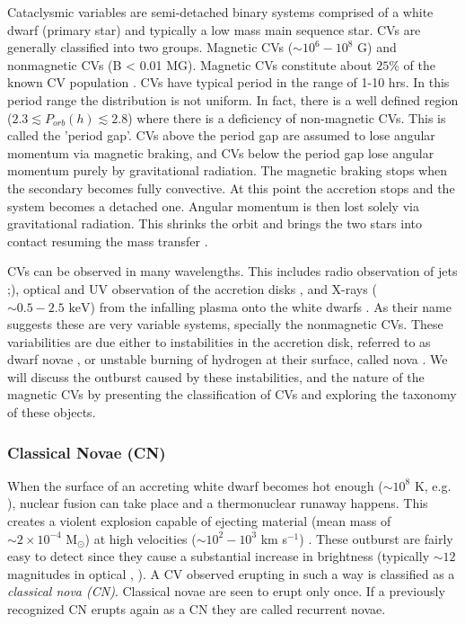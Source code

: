 Cataclysmic variables are semi-detached binary systems comprised of a white dwarf (primary star) and typically a low mass main sequence star. CVs are generally classified into two groups. Magnetic CVs ($\sim 10^6 - 10^8$ G) and nonmagnetic CVs (B < 0.01 MG). Magnetic CVs constitute about $25 \%$ of the known CV population \citep{balman_x-ray_2012}. CVs have typical period in the range of 1-10 hrs. In this period range the distribution is not uniform. In fact, there is a well defined region ($2.3 \lesssim P_{orb} (h) \lesssim 2.8$) where there is a deficiency of non-magnetic CVs. This is called the 'period gap'. CVs above the period gap are assumed to lose  angular momentum via magnetic braking, and CVs below the period gap lose angular momentum purely by gravitational radiation. The magnetic braking  stops when the secondary becomes fully convective. At this point the accretion stops and the system becomes a detached one. Angular momentum is then lost solely via gravitational radiation. This shrinks the orbit and brings the two stars into contact resuming the mass transfer \citep[e.g.][]{warner_cataclysmic_2003}.

CVs can be observed in many wavelengths. This includes radio observation of jets \citep{nova_jets_2008};\citep{coppejans_novalike_2015}), optical and UV observation of the accretion disks \citep{1994ASPC...54...61K}, and X-rays ($\sim 0.5-2.5 \text{ keV}$) from the infalling plasma onto the white dwarfs \citep{verbunt_cataclysmic_1997}. As their name suggests these are very variable systems, specially the nonmagnetic CVs. These variabilities are due either to instabilities in the accretion disk, referred to as dwarf novae \citep{osaki_accretion_1974}, or unstable burning of hydrogen at their surface, called nova \citep{starrfield_thermonuclear_2016}. We will discuss the outburst caused by these instabilities, and the nature of the magnetic CVs by presenting the classification of CVs and exploring the taxonomy of these objects.  

\subsubsection{Classical Novae (CN)}

When the surface of an accreting white dwarf becomes hot enough ($\sim 10^8$ K, e.g. \cite{starrfield_thermonuclear_2016}), nuclear fusion can take place and a thermonuclear runaway happens. This creates a violent explosion capable of ejecting material (mean mass of $\sim 2 \times 10^{-4} \text{ M}_\odot$) at high velocities ($\sim 10^2 - 10^3$ km s$^{-1}$) \citep{gehrz_nucleosynthesis_1998,shara_recent_1989}. These outburst are fairly easy to detect since they cause a substantial increase in brightness (typically $\sim 12$ magnitudes in optical , \citealt{shara_recent_1989}). A CV observed erupting in such a way is classified as a \emph{classical nova (CN)}. Classical novae are seen to erupt only once. If a previously recognized CN erupts again as a CN they are called recurrent novae. 

